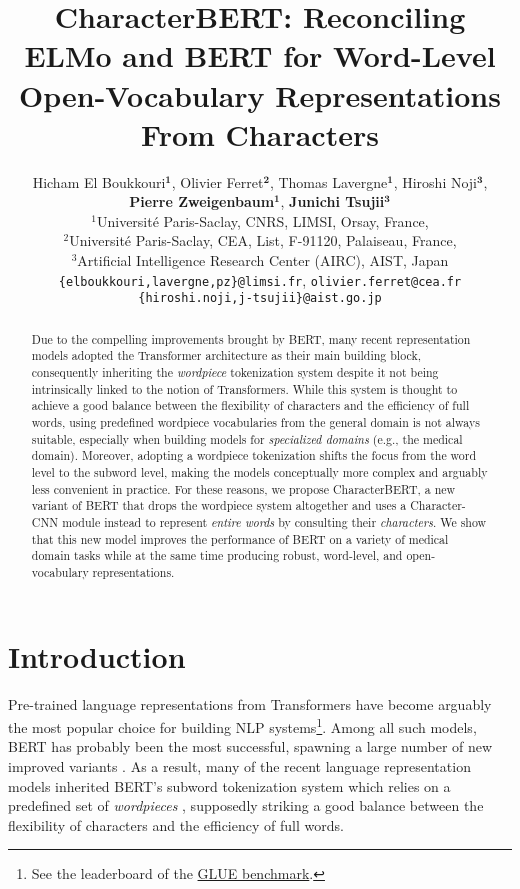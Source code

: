 \documentclass[11pt]{article}
\title{CharacterBERT: Reconciling ELMo and BERT for Word-Level Open-Vocabulary Representations From Characters}
\author{
  Hicham El Boukkouri$^{\mathbf{1}}$, Olivier Ferret$^{\mathbf{2}}$, Thomas Lavergne$^{\mathbf{1}}$, Hiroshi Noji$^{\mathbf{3}}$,\\ \textbf{Pierre Zweigenbaum}$^{\mathbf{1}}$, \textbf{Junichi Tsujii}$^{\mathbf{3}}$ \\[6pt]
  $^1$Universit\'e Paris-Saclay, CNRS, LIMSI, Orsay, France,\\
$^2$Universit\'e Paris-Saclay, CEA, List, F-91120, Palaiseau, France, \\
  $^3$Artificial Intelligence Research Center (AIRC), AIST, Japan \\
  \texttt{\{elboukkouri,lavergne,pz\}@limsi.fr},  \texttt{olivier.ferret@cea.fr}\\ 
  \texttt{\{hiroshi.noji,j-tsujii\}@aist.go.jp}\\ 
  }
\date{}
\begin{document}
\maketitle

\begin{abstract}
Due to the compelling improvements brought by BERT, many recent representation models adopted the Transformer architecture as their main building block, consequently inheriting the \textit{wordpiece} tokenization system despite it not being intrinsically linked to the notion of Transformers. While this system is thought to achieve a good balance between the flexibility of characters and the efficiency of full words, using predefined wordpiece vocabularies from the general domain is not always suitable, especially when building models for \textit{specialized domains} (e.g., the medical domain). Moreover, adopting a wordpiece tokenization shifts the focus from the word level to the subword level, making the models conceptually more complex and arguably less convenient in practice. For these reasons, we propose CharacterBERT, a new variant of BERT that drops the wordpiece system altogether and uses a Character-CNN module instead to represent \textit{entire words} by consulting their \textit{characters}. We show that this new model improves the performance of BERT on a variety of medical domain tasks while at the same time producing robust, word-level, and open-vocabulary representations. 
\end{abstract}

\section{Introduction}
Pre-trained language representations from Transformers \cite{vaswani2017attention} have become arguably the most popular choice for building NLP systems\footnote{See the leaderboard of the \href{https://gluebenchmark.com/leaderboard}{GLUE benchmark}.}. Among all such models, BERT \cite{devlin-etal-2019-bert} has probably been the most successful, spawning a large number of new improved variants \cite{liu2019roberta,lan2019albert,sun2019ernie,zhang2019ernie,clark2020electra}. As a result, many of the recent language representation models inherited BERT's subword tokenization system which relies on a predefined set of \textit{wordpieces} \cite{wu2016google}, supposedly striking a good balance between the flexibility of characters and the efficiency of full words.
\end{document}
